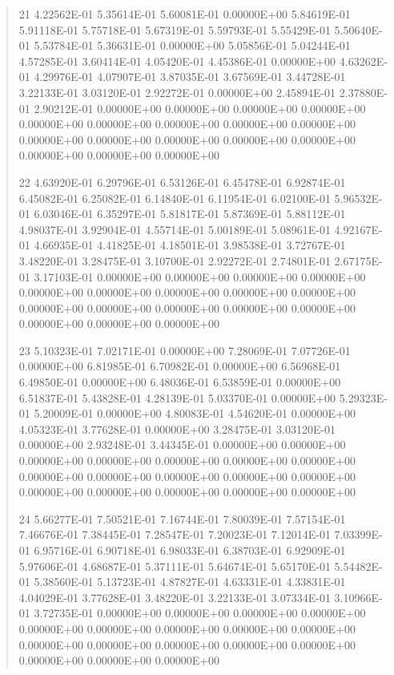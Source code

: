 \documentclass[letterpaper,10pt,english]{sphinxmanual}
\begin{document}
\begin{quote}
\begin{DUlineblock}{0em}
\item[] 21   4.22562E-01  5.35614E-01  5.60081E-01  0.00000E+00  5.84619E-01  5.91118E-01  5.75718E-01  5.67319E-01  5.59793E-01  5.55429E-01  5.50640E-01  5.53784E-01  5.36631E-01  0.00000E+00  5.05856E-01  5.04244E-01  4.57285E-01  3.60414E-01  4.05420E-01  4.45386E-01  0.00000E+00  4.63262E-01  4.29976E-01  4.07907E-01  3.87035E-01  3.67569E-01  3.44728E-01  3.22133E-01  3.03120E-01  2.92272E-01  0.00000E+00  2.45894E-01  2.37880E-01  2.90212E-01  0.00000E+00  0.00000E+00  0.00000E+00  0.00000E+00  0.00000E+00  0.00000E+00  0.00000E+00  0.00000E+00  0.00000E+00  0.00000E+00  0.00000E+00  0.00000E+00  0.00000E+00  0.00000E+00  0.00000E+00  0.00000E+00  0.00000E+00
\item[] 22   4.63920E-01  6.29796E-01  6.53126E-01  6.45478E-01  6.92874E-01  6.45082E-01  6.25082E-01  6.14840E-01  6.11954E-01  6.02100E-01  5.96532E-01  6.03046E-01  6.35297E-01  5.81817E-01  5.87369E-01  5.88112E-01  4.98037E-01  3.92904E-01  4.55714E-01  5.00189E-01  5.08961E-01  4.92167E-01  4.66935E-01  4.41825E-01  4.18501E-01  3.98538E-01  3.72767E-01  3.48220E-01  3.28475E-01  3.10700E-01  2.92272E-01  2.74801E-01  2.67175E-01  3.17103E-01  0.00000E+00  0.00000E+00  0.00000E+00  0.00000E+00  0.00000E+00  0.00000E+00  0.00000E+00  0.00000E+00  0.00000E+00  0.00000E+00  0.00000E+00  0.00000E+00  0.00000E+00  0.00000E+00  0.00000E+00  0.00000E+00  0.00000E+00
\item[] 23   5.10323E-01  7.02171E-01  0.00000E+00  7.28069E-01  7.07726E-01  0.00000E+00  6.81985E-01  6.70982E-01  0.00000E+00  6.56968E-01  6.49850E-01  0.00000E+00  6.48036E-01  6.53859E-01  0.00000E+00  6.51837E-01  5.43828E-01  4.28139E-01  5.03370E-01  0.00000E+00  5.29323E-01  5.20009E-01  0.00000E+00  4.80083E-01  4.54620E-01  0.00000E+00  4.05323E-01  3.77628E-01  0.00000E+00  3.28475E-01  3.03120E-01  0.00000E+00  2.93248E-01  3.44345E-01  0.00000E+00  0.00000E+00  0.00000E+00  0.00000E+00  0.00000E+00  0.00000E+00  0.00000E+00  0.00000E+00  0.00000E+00  0.00000E+00  0.00000E+00  0.00000E+00  0.00000E+00  0.00000E+00  0.00000E+00  0.00000E+00  0.00000E+00
\item[] 24   5.66277E-01  7.50521E-01  7.16744E-01  7.80039E-01  7.57154E-01  7.46676E-01  7.38445E-01  7.28547E-01  7.20023E-01  7.12014E-01  7.03399E-01  6.95716E-01  6.90718E-01  6.98033E-01  6.38703E-01  6.92909E-01  5.97606E-01  4.68687E-01  5.37111E-01  5.64674E-01  5.65170E-01  5.54482E-01  5.38560E-01  5.13723E-01  4.87827E-01  4.63331E-01  4.33831E-01  4.04029E-01  3.77628E-01  3.48220E-01  3.22133E-01  3.07334E-01  3.10966E-01  3.72735E-01  0.00000E+00  0.00000E+00  0.00000E+00  0.00000E+00  0.00000E+00  0.00000E+00  0.00000E+00  0.00000E+00  0.00000E+00  0.00000E+00  0.00000E+00  0.00000E+00  0.00000E+00  0.00000E+00  0.00000E+00  0.00000E+00  0.00000E+00

\end{DUlineblock}
\end{quote}
\end{document}
